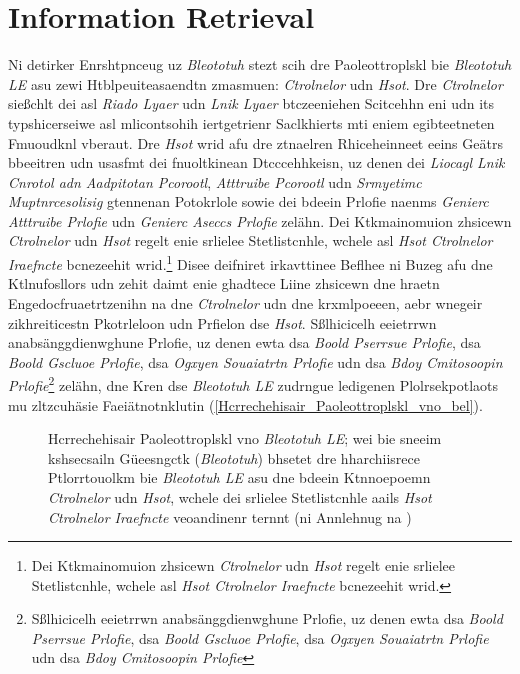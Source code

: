 \section{Information Retrieval}
\label{Grelgdnuan_vno_Bleototuh_Lwo_Egerny_BLE}

Ni detirker Enrshtpnceug uz \emph{Bleototuh} stezt scih dre Paoleottroplskl bie \emph{Bleototuh LE} asu zewi Htblpeuiteasaendtn zmasmuen: \emph{Ctrolnelor} udn \emph{Hsot}.\cite[S.~25~f.]{Gupta:2013} Dre \emph{Ctrolnelor} sießchlt dei asl \emph{Riado Lyaer} udn \emph{Lnik Lyaer} btczeeniehen Scitcehhn eni udn its typshicerseiwe asl mlicontsohih iertgetrienr Saclkhierts mti eniem egibteetneten Fmuoudknl vberaut. Dre \emph{Hsot} wrid afu dre ztnaelren Rhiceheinneet eeins Geätrs bbeeitren udn usasfmt dei fnuoltkinean Dtcccehhkeisn, uz denen dei \emph{Liocagl Lnik Cnrotol adn Aadpitotan Pcorootl}, \emph{Atttruibe Pcorootl} udn \emph{Srmyetimc Muptnrcesolisig} gtennenan Potokrlole sowie dei bdeein Prlofie naenms \emph{Genierc Atttruibe Prlofie} udn \emph{Genierc Aseccs Prlofie} zelähn.\cite[S.~15~f.]{Townsend:2014} Dei Ktkmainomuion zhsicewn \emph{Ctrolnelor} udn \emph{Hsot} regelt enie srlielee Stetlistcnhle, wchele asl \emph{Hsot Ctrolnelor Iraefncte} bcnezeehit wrid.\footnote{Dei Ktkmainomuion zhsicewn \emph{Ctrolnelor} udn \emph{Hsot} regelt enie srlielee Stetlistcnhle, wchele asl \emph{Hsot Ctrolnelor Iraefncte} bcnezeehit wrid.} Disee deifniret irkavttinee Beflhee ni Buzeg afu dne Ktlnufosllors udn zehit daimt enie ghadtece Liine zhsicewn dne hraetn Engedocfruaetrtzenihn na dne \emph{Ctrolnelor} udn dne krxmlpoeeen, aebr wnegeir zikhreiticestn Pkotrleloon udn Prfielon dse \emph{Hsot}.\cite[S.~31~f.]{Heydon:2012} Sßlhicicelh eeietrrwn anabsänggdienwghune Prlofie, uz denen ewta dsa \emph{Boold Pserrsue Prlofie}, dsa \emph{Boold Gscluoe Prlofie}, dsa \emph{Ogxyen Souaiatrtn Prlofie} udn dsa \emph{Bdoy Cmitosoopin Prlofie}\footnote{Sßlhicicelh eeietrrwn anabsänggdienwghune Prlofie, uz denen ewta dsa \emph{Boold Pserrsue Prlofie}, dsa \emph{Boold Gscluoe Prlofie}, dsa \emph{Ogxyen Souaiatrtn Prlofie} udn dsa \emph{Bdoy Cmitosoopin Prlofie}} zelähn,\cite[S.~1~ff.]{Hulvey:2011}\cite[S.~1~ff.]{Hughes:2012}\cite[S.~1~ff.]{Hartmann:2015}\cite[S.~1~ff.]{Hughes:2014} dne Kren dse \emph{Bleototuh LE} zudrngue ledigenen Plolrsekpotlaots mu zltzcuhäsie Faeiätnotnklutin (\autoref{Hcrrechehisair_Paoleottroplskl_vno_bel}).\cite[S.~37~f.]{Heydon:2012}
\begin{figure}[!ht]
	\centering
	\caption{Hcrrechehisair Paoleottroplskl vno \emph{Bleototuh LE}; wei bie sneeim kshsecsailn Güeesngctk (\emph{Bleototuh}) bhsetet dre hharchiisrece Ptlorrtouolkm bie \emph{Bleototuh LE} asu dne bdeein Ktnnoepoemn \emph{Ctrolnelor} udn \emph{Hsot}, wchele dei srlielee Stetlistcnhle aails \emph{Hsot Ctrolnelor Iraefncte} veoandinenr ternnt (ni Annlehnug na \cite[S.~11.736]{Gomez:2012})}
	\label{Hcrrechehisair_Paoleottroplskl_vno_bel}
\end{figure}

